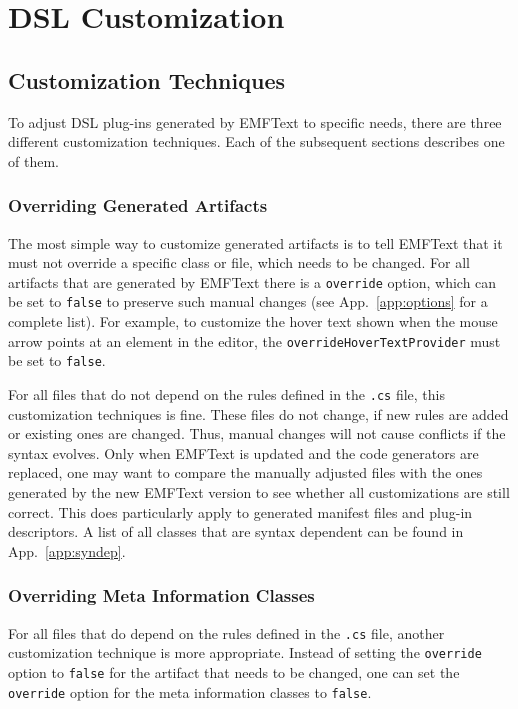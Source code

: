 \chapter{DSL Customization}
\label{chap:customisation}
\section{Customization Techniques}

To adjust DSL plug-ins generated by EMFText to specific needs, there are three
different customization techniques. Each of the subsequent sections describes
one of them.

\subsection{Overriding Generated Artifacts}
\label{sec:overriding_generated_artifacts}

The most simple way to customize generated artifacts is to tell EMFText that it
must not override a specific class or file, which needs to be changed. For
all artifacts that are generated by EMFText there is a \texttt{override} option,
which can be set to \texttt{false} to preserve such manual changes (see
App.~\ref{app:options} for a complete list). For example, to customize the hover
text shown when the mouse arrow points at an element in the editor, the 
\texttt{overrideHoverTextProvider} must be set to \texttt{false}.

For all files that do not depend on the rules defined in the \texttt{.cs} file,
this customization techniques is fine. These files do not change, if new rules
are added or existing ones are changed. Thus, manual changes will not cause
conflicts if the syntax evolves. Only when EMFText is updated and the code
generators are replaced, one may want to compare the manually adjusted files
with the ones generated by the new EMFText version to see whether all
customizations are still correct. This does particularly apply to generated
manifest files and plug-in descriptors. A list of all classes that are syntax
dependent can be found in App.~\ref{app:syndep}.

\subsection{Overriding Meta Information Classes}
\label{sec:overriding_generated_classes}

For all files that do depend on the rules defined in the \texttt{.cs} file,
another customization technique is more appropriate. Instead of setting
the \texttt{override} option to \texttt{false} for the artifact that needs to be
changed, one can set the \texttt{override} option for the meta information
classes to \texttt{false}. 


